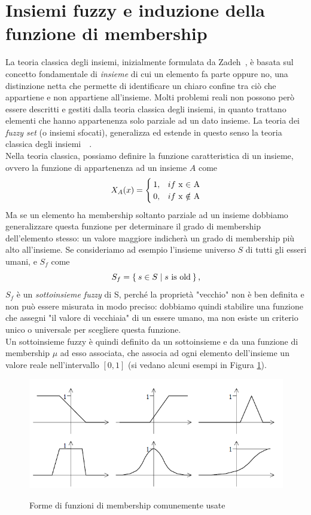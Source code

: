 \documentclass[oneside, openany]{book}
\begin{document}
		\section{Insiemi fuzzy e induzione della funzione di membership}
		La teoria classica degli insiemi, inizialmente formulata da Zadeh~\cite{bib:zadeh}, è basata sul concetto fondamentale di \textit{insieme} di cui un elemento fa parte oppure no, una distinzione netta che permette di identificare un chiaro confine tra ciò che appartiene e non appartiene all'insieme. Molti problemi reali non possono però essere descritti e gestiti dalla teoria classica degli insiemi, in quanto trattano elementi che hanno appartenenza solo parziale ad un dato insieme. La teoria dei \textit{fuzzy set} (o insiemi sfocati), generalizza ed estende in questo senso la teoria classica degli insiemi~\cite{bib:fuzzy}~\cite{bib:fuzzy2}.\\
		Nella teoria classica, possiamo definire la funzione caratteristica di un insieme, ovvero la funzione di appartenenza ad un insieme $A$ come
		\[
		X_A(x)=
		\begin{cases}
		1, & if $ x $ \in $ A$\\
		0, & if $ x $ \notin $ A$
		\end{cases}
		\]
		Ma se un elemento ha membership soltanto parziale ad un insieme dobbiamo generalizzare questa funzione per determinare il grado di membership dell'elemento stesso: un valore maggiore indicherà un grado di membership più alto all'insieme. Se consideriamo ad esempio l'insieme universo $S$ di tutti gli esseri umani, e $S_f$ come
		\[
		S_f=\Set{s \in S | s \text{ is old}}\text{,}
		\]
		$S_f$ è un \textit{sottoinsieme fuzzy} di S, perché la proprietà "vecchio" non è ben definita e non può essere misurata in modo preciso: dobbiamo quindi stabilire una funzione che assegni "il valore di vecchiaia" di un essere umano, ma non esiste un criterio unico o universale per scegliere questa funzione.\\
		Un sottoinsieme fuzzy è quindi definito da un sottoinsieme e da una funzione di membership $\mu$ ad esso associata, che associa ad ogni elemento dell'insieme un valore reale nell'intervallo $[0,1]$ (si vedano alcuni esempi in Figura \ref{fig:membership}).\\
	
		\begin{figure}[h]
			\centering
			{\includegraphics[width=.60\textwidth]{membership.png}} \quad
			\caption{Forme di funzioni di membership comunemente usate}
			\label{fig:membership}
			
		\end{figure}
	
\end{document}
